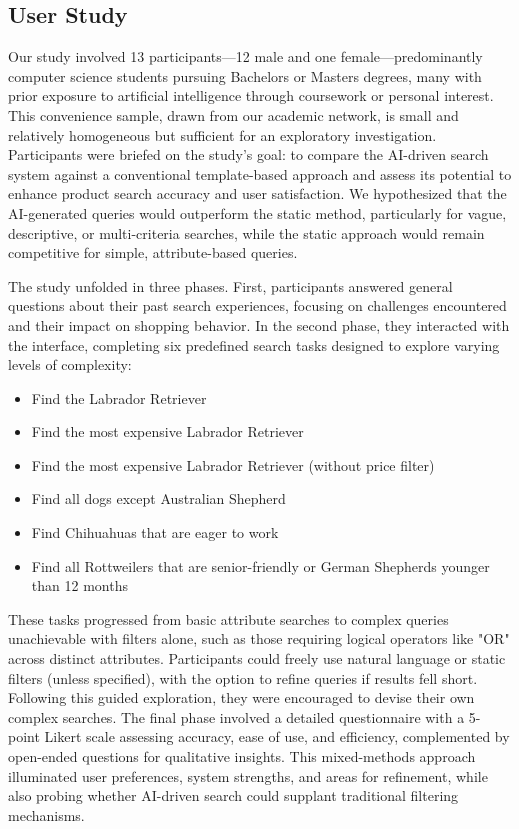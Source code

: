 \documentclass[../../submission.tex]{subfiles}
\begin{document}
\subsection{User Study}
Our study involved 13 participants—12 male and one female—predominantly computer science students pursuing Bachelors or Masters degrees, 
many with prior exposure to artificial intelligence through coursework or personal interest. This convenience sample, drawn from our academic 
network, is small and relatively homogeneous but sufficient for an exploratory investigation. Participants were briefed on the study’s goal: to 
compare the AI-driven search system against a conventional template-based approach and assess its potential to enhance product search accuracy and 
user satisfaction. We hypothesized that the AI-generated queries would outperform the static method, particularly for vague, descriptive, or multi-criteria 
searches, while the static approach would remain competitive for simple, attribute-based queries.

The study unfolded in three phases. First, participants answered general questions about their past search experiences, 
focusing on challenges encountered and their impact on shopping behavior. In the second phase, they interacted with the interface, 
completing six predefined search tasks designed to explore varying levels of complexity:

\begin{itemize}
   \item Find the Labrador Retriever
   \item Find the most expensive Labrador Retriever
   \item Find the most expensive Labrador Retriever (without price filter)
   \item Find all dogs except Australian Shepherd
   \item Find Chihuahuas that are eager to work
   \item Find all Rottweilers that are senior-friendly or German Shepherds younger than 12 months
\end{itemize}

These tasks progressed from basic attribute searches to complex queries unachievable with filters alone, 
such as those requiring logical operators like "OR" across distinct attributes. Participants could freely use 
natural language or static filters (unless specified), with the option to refine queries if results fell short. 
Following this guided exploration, they were encouraged to devise their own complex searches. The final phase involved a 
detailed questionnaire with a 5-point Likert scale assessing accuracy, ease of use, and efficiency, complemented by open-ended 
questions for qualitative insights. This mixed-methods approach illuminated user preferences, system strengths, and areas for refinement, 
while also probing whether AI-driven search could supplant traditional filtering mechanisms.
\end{document}
